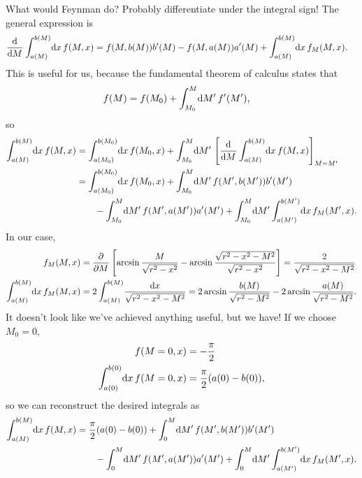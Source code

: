 What would Feynman do?
Probably differentiate under the integral sign!
The general expression is~\cite{flanders1973differentiation}
\begin{align}
	\dod{}{M} \int_{a(M)}^{b(M)}\! \dif x \, f(M, x)
	&= f(M, b(M)) b'(M) - f(M, a(M)) a'(M) + \int_{a(M)}^{b(M)}\! \dif x \, f_M(M, x).
\end{align}
This is useful for us, because the fundamental theorem of calculus states that~\cite[384]{stewart2008calculus}
\begin{align}
	f(M)
	&= f(M_0) + \int_{M_0}^M\! \dif M' \, f'(M'),
\end{align}
so
\begin{subequations}
\begin{align}
	\int_{a(M)}^{b(M)}\! \dif x \, f(M, x)
	&= \int_{a(M_0)}^{b(M_0)}\! \dif x \, f(M_0, x)
		+ \int_{M_0}^M\! \dif M' \, \left[ \dod{}{M} \int_{a(M)}^{b(M)}\! \dif x \, f(M, x) \right]_{M = M'} \\
	&= \int_{a(M_0)}^{b(M_0)}\! \dif x \, f(M_0, x) + \int_{M_0}^M\! \dif M' \, f(M', b(M')) b'(M') \notag \\
	&\qquad
		- \int_{M_0}^M\! \dif M' \, f(M', a(M')) a'(M') + \int_{M_0}^M\! \dif M' \int_{a(M')}^{b(M')}\! \dif x \, f_M(M', x).
\end{align}
\end{subequations}
In our case,
\begin{subequations}
\begin{align}
	f_M(M, x)
	&= \dpd{}{M} \left[ \arcsin{\frac{M}{\sqrt{r^2 - x^2}}} - \arcsin{\frac{\sqrt{r^2 - x^2 - M^2}}{\sqrt{r^2 - x^2}}} \right]
	= \frac{2}{\sqrt{r^2 - x^2 - M^2}} \\
	\int_{a(M)}^{b(M)}\! \dif x \, f_M(M, x)
	&= 2 \int_{a(M)}^{b(M)}\! \frac{\dif x}{\sqrt{r^2 - x^2 - M^2}}
	= 2 \arcsin{\frac{b(M)}{\sqrt{r^2 - M^2}}} - 2 \arcsin{\frac{a(M)}{\sqrt{r^2 - M^2}}}.
\end{align}
\end{subequations}
It doesn't look like we've achieved anything useful, but we have!
If we choose $M_0 = 0$,
\begin{subequations}
\begin{align}
	f(M = 0, x)
	&= -\frac{\pi}{2} \\
	\int_{a(0)}^{b(0)}\! \dif x \, f(M = 0, x)
	&= \frac{\pi}{2} (a(0) - b(0)),
\end{align}
\end{subequations}
so we can reconstruct the desired integrals as
\begin{align}
	\int_{a(M)}^{b(M)}\! \dif x \, f(M, x)
	&= \frac{\pi}{2} (a(0) - b(0)) + \int_0^M\! \dif M' \, f(M', b(M')) b'(M') \notag \\
	&\qquad
		- \int_0^M\! \dif M' \, f(M', a(M')) a'(M') + \int_0^M\! \dif M' \int_{a(M')}^{b(M')}\! \dif x \, f_M(M', x).
\end{align}

